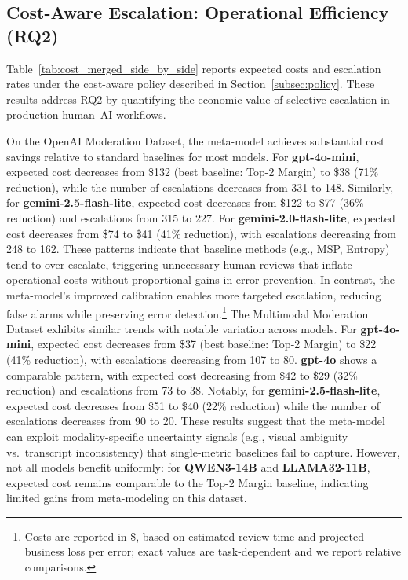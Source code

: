 \subsection{Cost-Aware Escalation: Operational Efficiency (RQ2)}
\label{subsec:cost_analysis}
Table~\ref{tab:cost_merged_side_by_side} reports expected costs and escalation rates under the cost-aware policy described in Section~\ref{subsec:policy}. These results address RQ2 by quantifying the economic value of selective escalation in production human--AI workflows.

 On the OpenAI Moderation Dataset, the meta-model achieves substantial cost savings relative to standard baselines for most models. For \textbf{gpt-4o-mini}, expected cost decreases from \$132 (best baseline: Top-2 Margin) to \$38 (71\% reduction), while the number of escalations decreases from 331 to 148. Similarly, for \textbf{gemini-2.5-flash-lite}, expected cost decreases from \$122 to \$77 (36\% reduction) and escalations from 315 to 227. For \textbf{gemini-2.0-flash-lite}, expected cost decreases from \$74 to \$41 (41\% reduction), with escalations decreasing from 248 to 162. These patterns indicate that baseline methods (e.g., MSP, Entropy) tend to over-escalate, triggering unnecessary human reviews that inflate operational costs without proportional gains in error prevention. In contrast, the meta-model’s improved calibration enables more targeted escalation, reducing false alarms while preserving error detection.\footnote{Costs are reported in \$, based on estimated review time and projected business loss per error; exact values are task-dependent and we report relative comparisons.}
 The Multimodal Moderation Dataset exhibits similar trends with notable variation across models. For \textbf{gpt-4o-mini}, expected cost decreases from \$37 (best baseline: Top-2 Margin) to \$22 (41\% reduction), with escalations decreasing from 107 to 80. \textbf{gpt-4o} shows a comparable pattern, with expected cost decreasing from \$42 to \$29 (32\% reduction) and escalations from 73 to 38. Notably, for \textbf{gemini-2.5-flash-lite}, expected cost decreases from \$51 to \$40 (22\% reduction) while the number of escalations decreases from 90 to 20. These results suggest that the meta-model can exploit modality-specific uncertainty signals (e.g., visual ambiguity vs.\ transcript inconsistency) that single-metric baselines fail to capture. However, not all models benefit uniformly: for \textbf{QWEN3-14B} and \textbf{LLAMA32-11B}, expected cost remains comparable to the Top-2 Margin baseline, indicating limited gains from meta-modeling on this dataset.
